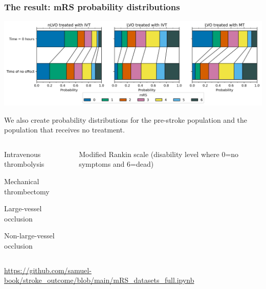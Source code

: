 \documentclass[xcolor={usenames,dvipsnames}]{beamer}
\newcommand{\smallurl}[1]{\textcolor{blue}{\fontsize{4pt}{4.8pt}\selectfont \url{#1}}}
\begin{document}
\begin{frame}
\frametitle{The result: mRS probability distributions}


\begin{center} 
\includegraphics[width=\textwidth]{./images/dist_bars}
\end{center} 


We also create probability distributions for the pre-stroke population and the population that receives no treatment. 

\vspace{0.5em}
    
\begin{columns}

    \begin{description}
        \tiny
        \item[IVT] Intravenous thrombolysis
        \item[MT] Mechanical thrombectomy
        \item[LVO] Large-vessel occlusion
        \item[nLVO] Non-large-vessel occlusion
    \end{description}
    
    
    \begin{description}
        \tiny
        \item[mRS] Modified Rankin scale (disability level where 0=no symptoms and 6=dead)
    \end{description}
    
\end{columns}

\vspace{1em}
\smallurl{https://github.com/samuel-book/stroke_outcome/blob/main/mRS_datasets_full.ipynb}

\end{frame}
\end{document}
